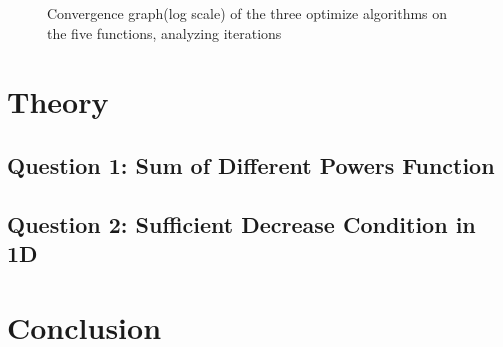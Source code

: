 \documentclass[12pt]{article}
\begin{document}
\begin{figure}[ht]
\centering
{}
\caption[]{Convergence graph(log scale) of the three optimize algorithms on the five functions, analyzing iterations}
\label{fig:convgraph}
\end{figure}


\section{Theory}

\subsection{Question 1: Sum of Different Powers Function}

\subsection{Question 2: Sufficient Decrease Condition in 1D}

\section{Conclusion}
\end{document}
